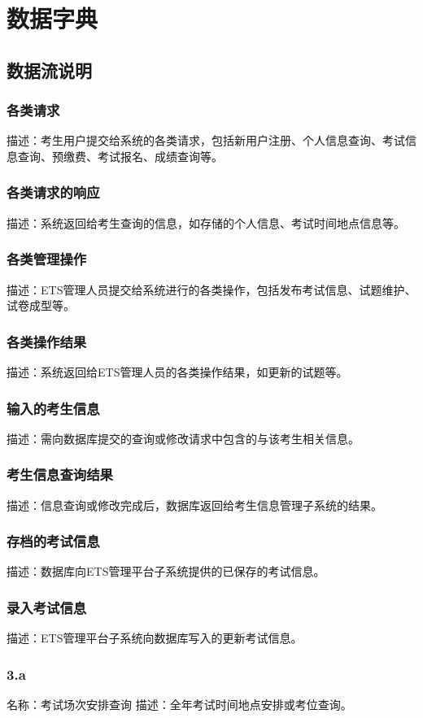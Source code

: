 \section{数据字典}
\subsection{数据流说明}
\subsubsection{各类请求}
描述：考生用户提交给系统的各类请求，包括新用户注册、个人信息查询、考试信息查询、预缴费、考试报名、成绩查询等。

\subsubsection{各类请求的响应}
描述：系统返回给考生查询的信息，如存储的个人信息、考试时间地点信息等。

\subsubsection{各类管理操作}
描述：ETS管理人员提交给系统进行的各类操作，包括发布考试信息、试题维护、试卷成型等。
\subsubsection{各类操作结果}
描述：系统返回给ETS管理人员的各类操作结果，如更新的试题等。
\subsubsection{输入的考生信息}
描述：需向数据库提交的查询或修改请求中包含的与该考生相关信息。
\subsubsection{考生信息查询结果}
描述：信息查询或修改完成后，数据库返回给考生信息管理子系统的结果。
\subsubsection{存档的考试信息}
描述：数据库向ETS管理平台子系统提供的已保存的考试信息。
\subsubsection{录入考试信息}
描述：ETS管理平台子系统向数据库写入的更新考试信息。
\subsubsection{3.a}
名称：考试场次安排查询
描述：全年考试时间地点安排或考位查询。
